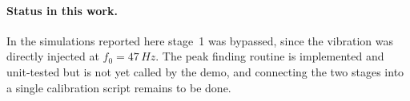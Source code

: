 \documentclass[11pt]{article}
\newcommand{\SI}[2]{#1\,#2}
\begin{document}

\paragraph{Status in this work.}
In the simulations reported here stage~1 was bypassed, since the vibration was directly injected at $f_0=\SI{47}{Hz}$.
%
The peak finding routine is implemented and unit-tested but is not yet called by the demo, and connecting the two stages into a single calibration script remains to be done.

%
%
%
\end{document}
